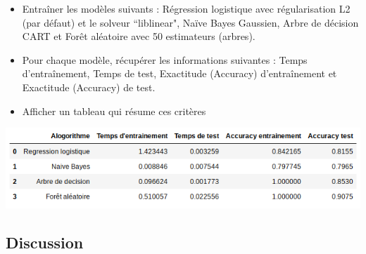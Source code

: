 \documentclass[12pt, a4paper]{article}
\begin{document}
\begin{itemize}
	\item Entraîner les modèles suivants : Régression logistique avec régularisation L2 (par défaut) et le solveur ``liblinear", Naïve Bayes Gaussien, Arbre de décision CART et Forêt aléatoire avec 50 estimateurs (arbres).
	\item Pour chaque modèle, récupérer les informations suivantes : Temps d'entraînement, Temps de test, Exactitude (Accuracy) d'entraînement et Exactitude (Accuracy) de test.
	\item Afficher un tableau qui résume ces critères
\end{itemize}

\includegraphics[width=\textwidth]{../img/workshop/criteres.png}

\subsection{Discussion}
\end{document}
